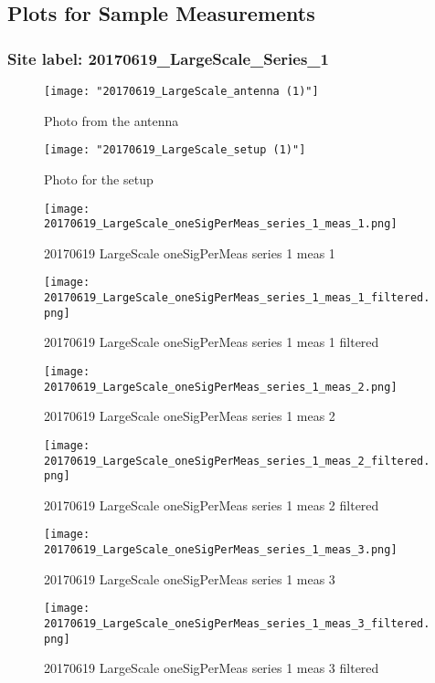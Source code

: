 \subsection{Plots for Sample Measurements}
\subsubsection{Site label: 20170619\_LargeScale\_Series\_1}
\begin{figure}[ht] \caption{Photo from the antenna}
\texttt{[image: "20170619\_LargeScale\_antenna (1)"]}\centering\end{figure}
\begin{figure}[ht] \caption{Photo for the setup}
\texttt{[image: "20170619\_LargeScale\_setup (1)"]}\centering\end{figure}
\begin{figure}[ht] \caption{20170619 LargeScale oneSigPerMeas series 1 meas 1}
\texttt{[image: 20170619\_LargeScale\_oneSigPerMeas\_series\_1\_meas\_1.png]}\centering\end{figure}
\begin{figure}[ht] \caption{20170619 LargeScale oneSigPerMeas series 1 meas 1 filtered}
\texttt{[image: 20170619\_LargeScale\_oneSigPerMeas\_series\_1\_meas\_1\_filtered.png]}\centering\end{figure}
\begin{figure}[ht] \caption{20170619 LargeScale oneSigPerMeas series 1 meas 2}
\texttt{[image: 20170619\_LargeScale\_oneSigPerMeas\_series\_1\_meas\_2.png]}\centering\end{figure}
\begin{figure}[ht] \caption{20170619 LargeScale oneSigPerMeas series 1 meas 2 filtered}
\texttt{[image: 20170619\_LargeScale\_oneSigPerMeas\_series\_1\_meas\_2\_filtered.png]}\centering\end{figure}
\begin{figure}[ht] \caption{20170619 LargeScale oneSigPerMeas series 1 meas 3}
\texttt{[image: 20170619\_LargeScale\_oneSigPerMeas\_series\_1\_meas\_3.png]}\centering\end{figure}
\begin{figure}[ht] \caption{20170619 LargeScale oneSigPerMeas series 1 meas 3 filtered}
\texttt{[image: 20170619\_LargeScale\_oneSigPerMeas\_series\_1\_meas\_3\_filtered.png]}\centering\end{figure}
\clearpage
